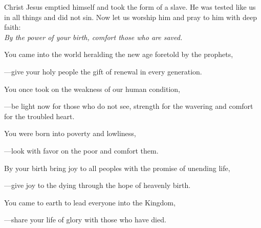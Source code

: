 \intercessions\indent

\begin{hangpar}

Christ Jesus emptied himself and took the form of a slave. He was tested like us in all things and did not sin. Now let us worship him and pray to him with deep faith:\\
\emph{By the power of your birth, comfort those who are saved.}

\medskip You came into the world heralding the new age foretold by the prophets,

{\color{red}---\thinspace}give your holy people the gift of renewal in every generation.

\medskip You once took on the weakness of our human condition,

{\color{red}---\thinspace}be light now for those who do not see, strength for the wavering and comfort for the troubled heart.

\medskip You were born into poverty and lowliness,

{\color{red}---\thinspace}look with favor on the poor and comfort them.

\medskip By your birth bring joy to all peoples with the promise of unending life,

{\color{red}---\thinspace}give joy to the dying through the hope of heavenly birth.

\medskip You came to earth to lead everyone into the Kingdom,

{\color{red}---\thinspace}share your life of glory with those who have died.

\medskip

\end{hangpar}